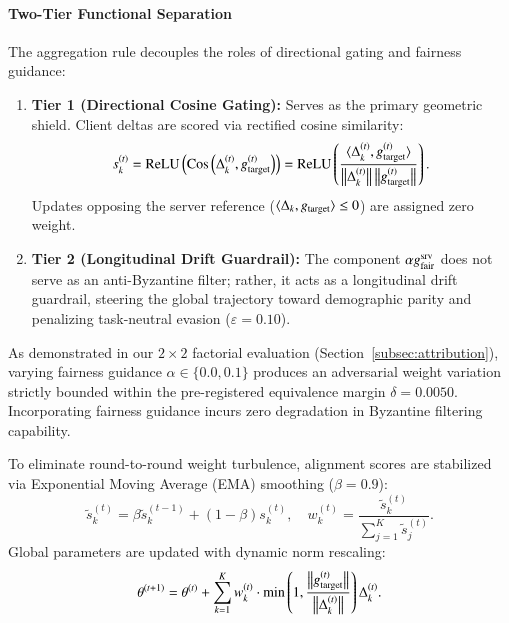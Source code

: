 \paragraph{Two-Tier Functional Separation}
The aggregation rule decouples the roles of directional gating and fairness guidance:
\begin{enumerate}[leftmargin=*]
    \item \textbf{Tier 1 (Directional Cosine Gating):} Serves as the primary geometric shield. Client deltas are scored via rectified cosine similarity:
    \begin{equation}
    \label{eq:score_raw}
    s_k^{(t)} = \operatorname{ReLU}\left( \operatorname{Cos}\left(\Delta_k^{(t)}, g_{\mathrm{target}}^{(t)}\right) \right) = \operatorname{ReLU}\left( \frac{\langle \Delta_k^{(t)}, g_{\mathrm{target}}^{(t)} \rangle}{\left\lVert \Delta_k^{(t)} \right\rVert \left\lVert g_{\mathrm{target}}^{(t)} \right\rVert} \right).
    \end{equation}
    Updates opposing the server reference ($\langle \Delta_k, g_{\mathrm{target}} \rangle \le 0$) are assigned zero weight.
    \item \textbf{Tier 2 (Longitudinal Drift Guardrail):} The component $\alpha g_{\mathrm{fair}}^{\mathrm{srv}}$ does not serve as an anti-Byzantine filter; rather, it acts as a longitudinal drift guardrail, steering the global trajectory toward demographic parity and penalizing task-neutral evasion ($\varepsilon = 0.10$).
\end{enumerate}

\begin{remark}
As demonstrated in our $2 \times 2$ factorial evaluation (Section~\ref{subsec:attribution}), varying fairness guidance $\alpha \in \{0.0, 0.1\}$ produces an adversarial weight variation strictly bounded within the pre-registered equivalence margin $\delta = 0.0050$. Incorporating fairness guidance incurs zero degradation in Byzantine filtering capability.
\end{remark}

To eliminate round-to-round weight turbulence, alignment scores are stabilized via Exponential Moving Average (EMA) smoothing ($\beta = 0.9$):
\begin{equation}
\label{eq:ema_smooth}
\tilde{s}_k^{(t)} = \beta \tilde{s}_k^{(t-1)} + (1-\beta) s_k^{(t)}, \quad w_k^{(t)} = \frac{\tilde{s}_k^{(t)}}{\sum_{j=1}^K \tilde{s}_j^{(t)}}.
\end{equation}
Global parameters are updated with dynamic norm rescaling:
\begin{equation}
\label{eq:model_update}
\theta^{(t+1)} = \theta^{(t)} + \sum_{k=1}^K w_k^{(t)} \cdot \min\left(1, \frac{\left\lVert g_{\mathrm{target}}^{(t)} \right\rVert}{\left\lVert \Delta_k^{(t)} \right\rVert}\right) \Delta_k^{(t)}.
\end{equation}

